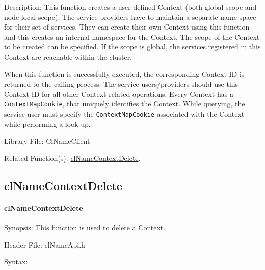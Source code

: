 \begin{flushleft}
\begin{Desc}
\item[Description:]This function creates a user-defined Context (both global scope and node local scope). The service providers have to maintain a 
separate name space for their set of services. They can create their own Context using this function and this creates an internal namespace for the Context. 
The scope of the Context to be created can be specified. If the scope is global, the services registered in this Context are reachable within the cluster. 
\par
When this function is successfully executed, the corresponding Context ID is returned to the calling process. The service-users/providers should use this 
Context ID for all other Context related operations. Every Context has a {\tt{ContextMapCookie}}, that uniquely identifies the Context. While querying, the 
service user must specify the {\tt{ContextMapCookie}} associated with the Context while performing a look-up.
\end{Desc}
\begin{Desc}
\item[Library File:]Cl\-Name\-Client\end{Desc}
\begin{Desc}
\item[Related Function(s):]\hyperlink{pagens107}{cl\-Name\-Context\-Delete}. \end{Desc}
\newpage


\subsection{clNameContextDelete}
\hypertarget{pagens107}{}\paragraph{cl\-Name\-Context\-Delete}\label{pagens107}
\begin{Desc}
\item[Synopsis:]This function is used to delete a Context.\end{Desc}
\begin{Desc}
\item[Header File:]clNameApi.h\end{Desc}
\begin{Desc}
\item[Syntax:]


\end{Desc}
\end{flushleft}
